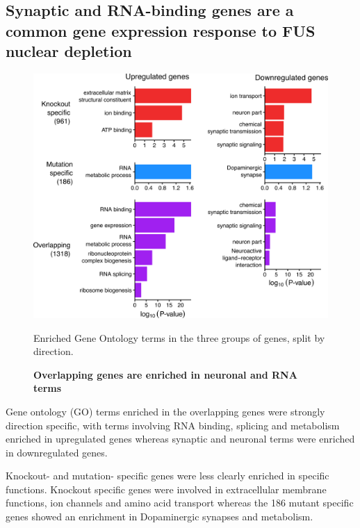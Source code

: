 \subsection{Synaptic and RNA-binding genes are a common gene expression response to FUS nuclear depletion}

\begin{figure}[h!]
	\centering
	\includegraphics[width=12cm]{Figures/06_fus_meta/expression_curated_go_terms.png}
	\caption{\textbf{Overlapping genes are enriched in neuronal and RNA terms} }	
	Enriched Gene Ontology terms in the three groups of genes, split by direction.
	\label{fig:fus_expression_go}
\end{figure}


Gene ontology (GO) terms enriched in the overlapping genes were strongly direction specific, with terms involving RNA binding, splicing and metabolism enriched in upregulated genes whereas synaptic and neuronal terms were enriched in downregulated genes.

Knockout- and mutation- specific genes were less clearly enriched in specific functions. Knockout specific genes were involved in extracellular membrane functions, ion channels and amino acid transport whereas the 186 mutant specific genes showed an enrichment in Dopaminergic synapses and metabolism.

